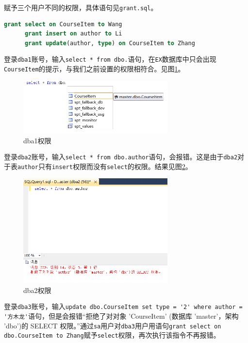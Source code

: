 \documentclass[11pt]{article}
\begin{document}
  赋予三个用户不同的权限，具体语句见\verb|grant.sql|。
  \begin{file}
    \begin{lstlisting}[language=sql]
      grant select on CourseItem to Wang
      grant insert on author to Li
      grant update(author, type) on CourseItem to Zhang
    \end{lstlisting}
  \end{file}

  登录\verb|dba1|账号，输入\lstinline{select * from dbo.}语句，在\verb|EX|数据库中只会出现\verb|CourseItem|的提示，与我们之前设置的权限相符合。见图\ref{fig:dba1}。

  \begin{figure}[h]
    \centering
    \includegraphics[width=0.7\textwidth]{dba1.png}
    \caption{dba1权限}
    \label{fig:dba1}
  \end{figure}

  登录\verb|dba2|账号，输入\lstinline{select * from dbo.author}语句，会报错。这是由于\verb|dba2|对于表\verb|author|只有\verb|insert|权限而没有\verb|select|的权限。结果见图\ref{fig:dba2}。
  \begin{figure}[h]
    \centering
    \includegraphics[width=0.7\textwidth]{dba2.png}
    \caption{dba2权限}
    \label{fig:dba2}
  \end{figure}

  登录\verb|dba3|账号，输入\lstinline{update dbo.CourseItem set type = '2' where author = '方木龙'}语句，但是会报错“拒绝了对对象 'CourseItem' (数据库 'master'，架构 'dbo')的 SELECT 权限。”通过\verb|sa|用户对\verb|dba3|用户用语句\lstinline{grant select on dbo.CourseItem to Zhang}赋予\verb|select|权限，再次执行该指令不再报错。
  
\end{document}
